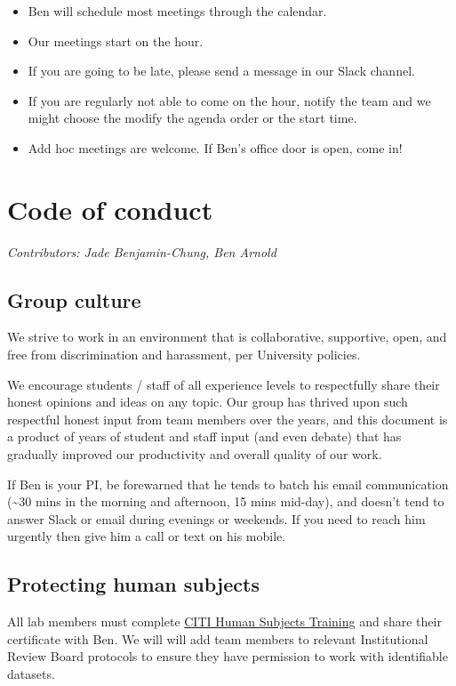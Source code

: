 \documentclass[
]{book}
\providecommand{\tightlist}{%
  \setlength{\itemsep}{0pt}\setlength{\parskip}{0pt}}
\begin{document}
\begin{itemize}
\tightlist
\item
  Ben will schedule most meetings through the calendar.
\item
  Our meetings start on the hour.
\item
  If you are going to be late, please send a message in our Slack channel.
\item
  If you are regularly not able to come on the hour, notify the team and we might choose the modify the agenda order or the start time.
\item
  Add hoc meetings are welcome. If Ben's office door is open, come in!
\end{itemize}

\chapter{Code of conduct}\label{code-of-conduct}

\emph{Contributors: Jade Benjamin-Chung, Ben Arnold}

\section{Group culture}\label{group-culture}

We strive to work in an environment that is collaborative, supportive, open, and free from discrimination and harassment, per University policies.

We encourage students / staff of all experience levels to respectfully share their honest opinions and ideas on any topic. Our group has thrived upon such respectful honest input from team members over the years, and this document is a product of years of student and staff input (and even debate) that has gradually improved our productivity and overall quality of our work.

If Ben is your PI, be forewarned that he tends to batch his email communication (\textasciitilde30 mins in the morning and afternoon, 15 mins mid-day), and doesn't tend to answer Slack or email during evenings or weekends. If you need to reach him urgently then give him a call or text on his mobile.

\section{Protecting human subjects}\label{protecting-human-subjects}

All lab members must complete \href{https://irb.ucsf.edu/citi-human-subjects-training}{CITI Human Subjects Training} and share their certificate with Ben. We will will add team members to relevant Institutional Review Board protocols to ensure they have permission to work with identifiable datasets.
\end{document}
